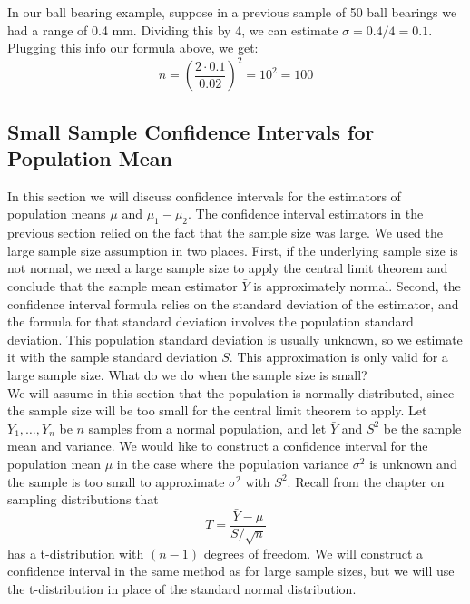 \documentclass[notes.tex]{subfiles}
\begin{document}
In our ball bearing example, suppose in a previous sample of 50 ball bearings we had a range of 0.4 mm. Dividing this by 4, we can estimate $\sigma = 0.4/4 = 0.1$. Plugging this info our formula above, we get:
\[
n = \left( \frac{2 \cdot 0.1}{0.02}\right)^2 = 10^2 = 100
\]

\subsection{Small Sample Confidence Intervals for Population Mean}
In this section we will discuss confidence intervals for the estimators of population means $\mu$ and $\mu_1 - \mu_2$. The confidence interval estimators in the previous section relied on the fact that the sample size was large. We used the large sample size assumption in two places. First, if the underlying sample size is not normal, we need a large sample size to apply the central limit theorem and conclude that the sample mean estimator $\bar{Y}$ is approximately normal. Second, the confidence interval formula relies on the standard deviation of the estimator, and the formula for that standard deviation involves the population standard deviation. This population standard deviation is usually unknown, so we estimate it with the sample standard deviation $S$. This approximation is only valid for a large sample size. What do we do when the sample size is small?\\

We will assume in this section that the population is normally distributed, since the sample size will be too small for the central limit theorem to apply. Let $Y_1, \dots, Y_n$ be $n$ samples from a normal population, and let $\bar{Y}$ and $S^2$ be the sample mean and variance. We would like to construct a confidence interval for the population mean $\mu$ in the case where the population variance $\sigma^2$ is unknown and the sample is too small to approximate $\sigma^2$ with $S^2$. Recall from the chapter on sampling distributions that 
\[
T = \frac{\bar{Y} - \mu}{S/\sqrt{n}}
\]
has a t-distribution with $(n-1)$ degrees of freedom. We will construct a confidence interval in the same method as for large sample sizes, but we will use the t-distribution in place of the standard normal distribution. 
\end{document}
